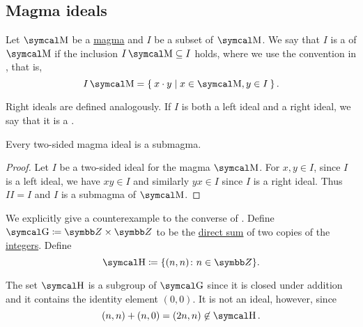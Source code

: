 \subsection{Magma ideals}\label{sec:magma_ideals}

\begin{definition}\label{def:magma_ideal}
  Let \( \CM \) be a \hyperref[def:magma]{magma} and \( I \) be a subset of \( \CM \). We say that \( I \) is a  of \( \CM \) if the inclusion \( I\CM \subseteq I \) holds, where we use the convention in , that is,
  \begin{equation*}
    I \CM = \Set{ x \cdot y | x \in \CM, y \in I }.
  \end{equation*}

  Right ideals are defined analogously. If \( I \) is both a left ideal and a right ideal, we say that it is a .
\end{definition}

\begin{proposition}\label{thm:magma_ideal_is_submagma}
  Every two-sided magma ideal is a submagma.
\end{proposition}
\begin{proof}
  Let \( I \) be a two-sided ideal for the magma \( \CM \). For \( x, y \in I \), since \( I \) is a left ideal, we have \( xy \in I \) and similarly \( yx \in I \) since \( I \) is a right ideal. Thus \( II = I \) and \( I \) is a submagma of \( \CM \).
\end{proof}

\begin{example}\label{ex:subgroup_is_not_ideal}
  We explicitly give a counterexample to the converse of . Define \( \CG \coloneqq \BZ \times \BZ \) to be the \hyperref[def:group_direct_sum]{direct sum} of two copies of the \hyperref[def:integers]{integers}. Define
  \begin{equation*}
    \CH \coloneqq \{ (n, n) \colon n \in \BZ \}.
  \end{equation*}

  The set \( \CH \) is a subgroup of \( \CG \) since it is closed under addition and it contains the identity element \( (0, 0) \). It is not an ideal, however, since
  \begin{equation*}
    (n, n) + (n, 0) = (2n, n) \not\in \CH.
  \end{equation*}
\end{example}


